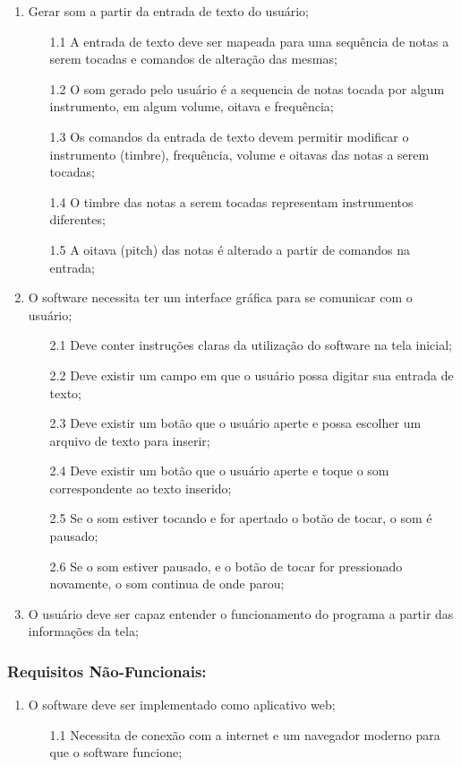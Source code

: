 \documentclass[12pt]{article}
\begin{document}
\begin{enumerate}
    \item Gerar som a partir da entrada de texto do usuário;
    \begin{enumerate}
        \item[1.1] A entrada de texto deve ser mapeada para uma sequência de notas a serem tocadas e comandos de alteração das mesmas;
        \item[1.2] O som gerado pelo usuário é a sequencia de notas tocada por algum instrumento, em algum volume, oitava e frequência;
        \item[1.3] Os comandos da entrada de texto devem permitir modificar o instrumento (timbre), frequência, volume e oitavas das notas a serem tocadas;
        \item[1.4] O timbre das notas a serem tocadas representam instrumentos diferentes;
        \item[1.5]  A oitava (pitch) das notas é alterado a partir de comandos na entrada;
    \end{enumerate}
    
    \item O software necessita ter um interface gráfica para se comunicar com o usuário;
    \begin{enumerate}
        \item[2.1] Deve conter instruções claras da utilização do software na tela inicial;
        \item[2.2] Deve existir um campo em que o usuário possa digitar sua entrada de texto;
        \item [2.3] Deve existir um botão que o usuário aperte e possa escolher um arquivo de texto para inserir;
        \item[2.4] Deve existir um botão que o usuário aperte e toque o som correspondente ao texto inserido;
        \item[2.5] Se o som estiver tocando e for apertado o botão de tocar, o som é pausado;
        \item[2.6] Se o som estiver pausado, e o botão de tocar for pressionado novamente, o som continua de onde parou;
    \end{enumerate}

    \item O usuário deve ser capaz entender o funcionamento do programa a partir das informações da tela;
\end{enumerate}

\subsubsection{Requisitos Não-Funcionais:}
    \begin{enumerate}
        \item O software deve ser implementado como aplicativo web;
        \begin{enumerate}
            \item[1.1] Necessita de conexão com a internet e um navegador moderno para que o software funcione;
        \end{enumerate}
    \end{enumerate}
\end{document}
